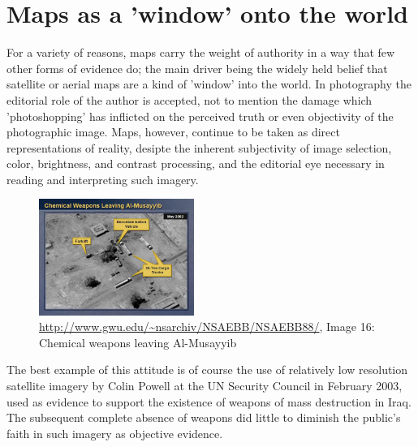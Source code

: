 \documentclass[11pt]{report}
\begin{document}
\section{Maps as a 'window' onto the world}


For a variety of reasons, maps carry the weight of authority in a way that few other forms of evidence do; the main driver being the widely held belief that satellite or aerial maps are a kind of 'window' into the world. In photography the editorial role of the author is accepted, not to mention the damage which 'photoshopping' has inflicted on the perceived truth or even objectivity of the photographic image. Maps, however, continue to be taken as direct representations of reality, desipte the inherent subjectivity of image selection, color, brightness, and contrast processing, and the editorial eye necessary in reading and interpreting such imagery. 

\begin{figure}
	\begin{flushright}
		\includegraphics[width=0.45\textwidth]{images/iraq-image-16.jpg}
		\caption{\url{http://www.gwu.edu/~nsarchiv/NSAEBB/NSAEBB88/}, Image 16: Chemical weapons leaving Al-Musayyib}
	\end{flushright}
\end{figure}

The best example of this attitude is of course the use of relatively low resolution satellite imagery by Colin Powell at the UN Security Council in February 2003, used as evidence to support the existence of weapons of mass destruction in Iraq. The subsequent complete absence of weapons did little to diminish the public's faith in such imagery as objective evidence. 
\end{document}
